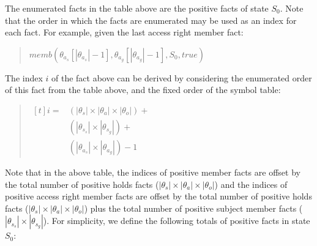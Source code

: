 \documentclass[10pt, twocolumn]{article}
\begin{document}
          The enumerated facts in the table above are the positive facts of
          state $S_{0}$. Note that the order in which the facts are enumerated
          may be used as an index for each fact. For example, given the last
          access right member fact:

          \begin{quote}
            $memb({\theta}_{a_s}[|{\theta}_{a_s}| - 1], {\theta}_{a_g}[|{\theta}_{a_g}| - 1], S_{0}, true)$
          \end{quote}

          The index $i$ of the fact above can be derived by considering the
          enumerated order of this fact from the table above, and the fixed
          order of the symbol table:

          \begin{quote}
            \begin{math}
              \begin{aligned}[t]
                i =& (|{\theta}_{s}| \times |{\theta}_{a}| \times |{\theta}_{o}|) + \\
                & (|{\theta}_{s_s}| \times |{\theta}_{s_g}|) + \\
                & (|{\theta}_{a_s}| \times |{\theta}_{a_g}|) - 1
              \end{aligned}
            \end{math}
          \end{quote}

          Note that in the above table, the indices of positive member facts
          are offset by the total number of positive holds facts
          ($|{\theta}_{s}| \times |{\theta}_{a}| \times |{\theta}_{o}|$) and
          the indices of positive access right member facts are offset by the
          total number of positive holds facts ($|{\theta}_{s}| \times
          |{\theta}_{a}| \times |{\theta}_{o}|$) plus the total number of
          positive subject member facts ($|{\theta}_{s_s}| \times
          |{\theta}_{s_g}|$). For simplicity, we define the following totals
          of positive facts in state $S_{0}$:
\end{document}
